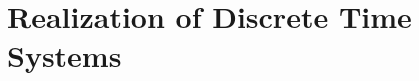\documentclass[../course]{subfiles}
\begin{document}
\chapter{Realization of Discrete Time Systems}


\end{document}

